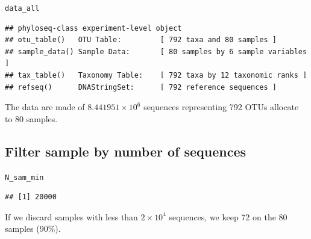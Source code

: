 \documentclass[12pt]{article}\usepackage[]{graphicx}\usepackage[]{color}
\makeatletter
\newcommand{\hlstd}[1]{\textcolor[rgb]{0.345,0.345,0.345}{#1}}%
\newenvironment{kframe}{%
 \def\at@end@of@kframe{}%
 \ifinner\ifhmode%
  \def\at@end@of@kframe{\end{minipage}}%
  \begin{minipage}{\columnwidth}%
 \fi\fi%
 \def\FrameCommand##1{\hskip\@totalleftmargin \hskip-\fboxsep
 \colorbox{shadecolor}{##1}\hskip-\fboxsep
     \hskip-\linewidth \hskip-\@totalleftmargin \hskip\columnwidth}%
 \MakeFramed {\advance\hsize-\width
   \@totalleftmargin\z@ \linewidth\hsize
   \@setminipage}}%
 {\par\unskip\endMakeFramed%
 \at@end@of@kframe}
\newenvironment{knitrout}{}{} %
\numberwithin{figure}{section}
\makeatother
\begin{document}
\begin{knitrout}\small
{}\color{fgcolor}\begin{kframe}
\begin{alltt}
\hlstd{data_all}
\end{alltt}
\begin{verbatim}
## phyloseq-class experiment-level object
## otu_table()   OTU Table:         [ 792 taxa and 80 samples ]
## sample_data() Sample Data:       [ 80 samples by 6 sample variables ]
## tax_table()   Taxonomy Table:    [ 792 taxa by 12 taxonomic ranks ]
## refseq()      DNAStringSet:      [ 792 reference sequences ]
\end{verbatim}
\end{kframe}
\end{knitrout}

The data are made of \ensuremath{8.441951\times 10^{6}} sequences representing 792 OTUs allocate to 80 samples.

  \subsection{Filter sample by number of sequences}

\begin{knitrout}\small
{}\color{fgcolor}\begin{kframe}
\begin{alltt}
\hlstd{N_sam_min}
\end{alltt}
\begin{verbatim}
## [1] 20000
\end{verbatim}
\end{kframe}
\end{knitrout}

If we discard samples with less than \ensuremath{2\times 10^{4}} sequences, we keep 72 on the 80 samples (90\%).
\end{document}
